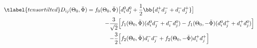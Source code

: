 \begin{align} \tlabel{tensortilted}
    D_{ij}(\Theta_0, \bar\Phi) = f_0(\Theta_0, \bar \Phi) &\big[ d_i^0 d_j^0 + \frac{1}{2}\bb{d_i^+ d_j^- + d_i^- d_j^+} \big] \\
      \qquad-\frac{3}{\sqrt{2}} &\Big[ f_1(\Theta_0, \bar \Phi)  (d_i^0 d_j^- + d_i^- d_j^0) - f_1(\Theta_0, -\bar \Phi) (d_i^0 d_j^+ + d_i^+ d_j^0) \Big]\\
      \qquad-\frac{3}{2} &\Big[ f_2(\Theta_0, \bar \Phi) d_i^- d_j^- + f_2(\Theta_0, -\bar \Phi) d_i^+ d_j^+\Big]
\end{align}


